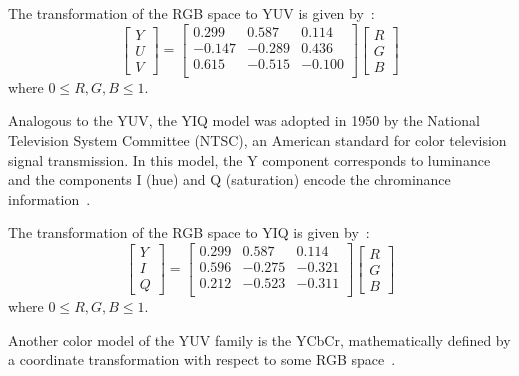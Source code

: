 The transformation of the RGB space to YUV is given by~\citep{pedrini:08}:\\
\begin{equation}
  \begin{bmatrix}
    Y \\ U \\ V
  \end{bmatrix} = 
  \begin{bmatrix}
     0.299 &  0.587 &  0.114 \\
    -0.147 & -0.289 &  0.436 \\
     0.615 & -0.515 & -0.100 \\
  \end{bmatrix}
  \begin{bmatrix}
    R \\ G \\ B
  \end{bmatrix}
\end{equation}
where $0 \leq R, G, B \leq 1$.

Analogous to the YUV, the YIQ model was adopted in 1950 by the National Television System Committee (NTSC), an American standard for color television signal transmission. In this model, the Y component corresponds to luminance and the components I (hue) and Q (saturation) encode the chrominance information~\citep{pedrini:08}.

The transformation of the RGB space to YIQ is given by~\citep{pedrini:08}:\\
\begin{equation}
  \begin{bmatrix}
    Y \\ I \\ Q
  \end{bmatrix} = 
  \begin{bmatrix}
    0.299  &  0.587 &  0.114 \\
    0.596  & -0.275 & -0.321 \\
    0.212  & -0.523 & -0.311 \\
  \end{bmatrix}
  \begin{bmatrix}
    R \\ G \\ B
  \end{bmatrix}
\end{equation}
where $0 \leq R, G, B \leq 1$.

Another color model of the YUV family is the YCbCr, mathematically defined by a coordinate transformation with respect to some RGB space~\citep{pedrini:08}.

